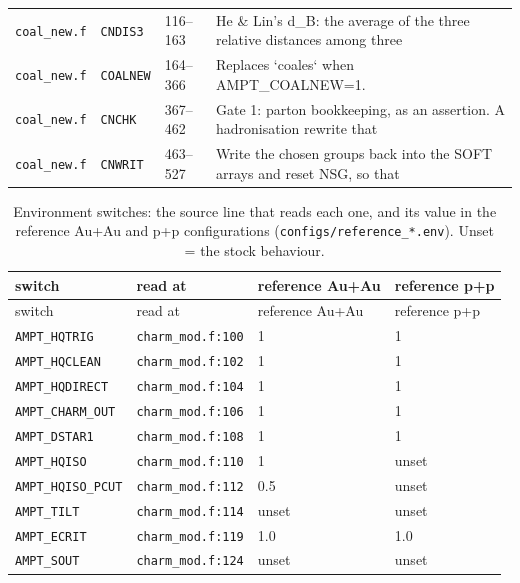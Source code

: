 {\begin{longtable}{@{}p{1.9cm}p{2.0cm}p{1.6cm}p{9.4cm}@{}}
\texttt{coal\_new.f} & \texttt{CNDIS3} & 116--163 & He \& Lin's d\_\allowbreak{}B: the average of the three relative distances among three \\
\texttt{coal\_new.f} & \texttt{COALNEW} & 164--366 & Replaces `coales` when AMPT\_\allowbreak{}COALNEW=1. \\
\texttt{coal\_new.f} & \texttt{CNCHK} & 367--462 & Gate 1: parton bookkeeping, as an assertion. A hadronisation rewrite that \\
\texttt{coal\_new.f} & \texttt{CNWRIT} & 463--527 & Write the chosen groups back into the SOFT arrays and reset NSG, so that \\
\bottomrule \end{longtable}}

{\small\begin{longtable}{@{}p{4.2cm}p{3.4cm}p{2.8cm}p{2.8cm}@{}}
\caption{Environment switches: the source line that reads each one, and its value in the reference Au+Au and p+p configurations (\texttt{configs/reference\_*.env}). Unset = the stock behaviour.}\label{tab:switches}\\
\toprule switch & read at & reference Au+Au & reference p+p \\ \midrule \endfirsthead
\toprule switch & read at & reference Au+Au & reference p+p \\ \midrule \endhead
\texttt{AMPT\_\allowbreak{}HQTRIG} & \texttt{charm\_\allowbreak{}mod.f:100} & 1 & 1 \\
\texttt{AMPT\_\allowbreak{}HQCLEAN} & \texttt{charm\_\allowbreak{}mod.f:102} & 1 & 1 \\
\texttt{AMPT\_\allowbreak{}HQDIRECT} & \texttt{charm\_\allowbreak{}mod.f:104} & 1 & 1 \\
\texttt{AMPT\_\allowbreak{}CHARM\_\allowbreak{}OUT} & \texttt{charm\_\allowbreak{}mod.f:106} & 1 & 1 \\
\texttt{AMPT\_\allowbreak{}DSTAR1} & \texttt{charm\_\allowbreak{}mod.f:108} & 1 & 1 \\
\texttt{AMPT\_\allowbreak{}HQISO} & \texttt{charm\_\allowbreak{}mod.f:110} & 1 & unset \\
\texttt{AMPT\_\allowbreak{}HQISO\_\allowbreak{}PCUT} & \texttt{charm\_\allowbreak{}mod.f:112} & 0.5 & unset \\
\texttt{AMPT\_\allowbreak{}TILT} & \texttt{charm\_\allowbreak{}mod.f:114} & unset & unset \\
\texttt{AMPT\_\allowbreak{}ECRIT} & \texttt{charm\_\allowbreak{}mod.f:119} & 1.0 & 1.0 \\
\texttt{AMPT\_\allowbreak{}SOUT} & \texttt{charm\_\allowbreak{}mod.f:124} & unset & unset \\

\end{longtable}}
